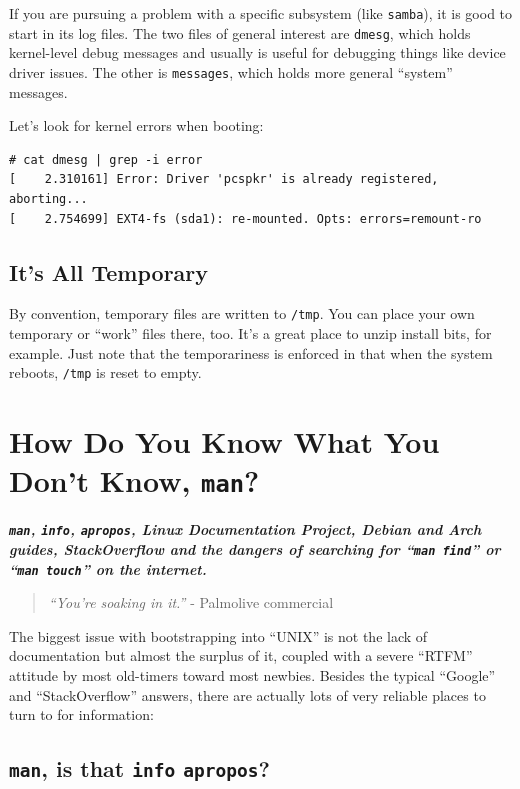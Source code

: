 \documentclass[10pt,]{book}
\numberwithin{figure}{chapter}
\begin{document}
If you are pursuing a problem with a specific subsystem (like
\texttt{samba}), it is good to start in its log files. The two files of
general interest are \texttt{dmesg}, which holds kernel-level debug
messages and usually is useful for debugging things like device driver
issues. The other is \texttt{messages}, which holds more general
``system'' messages.

Let's look for kernel errors when booting:

\begin{verbatim}
# cat dmesg | grep -i error
[    2.310161] Error: Driver 'pcspkr' is already registered, aborting...
[    2.754699] EXT4-fs (sda1): re-mounted. Opts: errors=remount-ro
\end{verbatim}

\section{It's All Temporary}\label{its-all-temporary}

By convention, temporary files are written to \texttt{/tmp}. You can
place your own temporary or ``work'' files there, too. It's a great
place to unzip install bits, for example. Just note that the
temporariness is enforced in that when the system reboots, \texttt{/tmp}
is reset to empty.

\chapter{How Do You Know What You Don't Know,
\texttt{man}?}\label{how-do-you-know-what-you-dont-know-man}

\textbf{\emph{\texttt{man}, \texttt{info}, \texttt{apropos}, Linux
Documentation Project, Debian and Arch guides, StackOverflow and the
dangers of searching for ``\texttt{man find}'' or ``\texttt{man touch}''
on the internet.}}

\begin{quote}
\emph{``You're soaking in it.''} - Palmolive commercial
\end{quote}

The biggest issue with bootstrapping into ``UNIX'' is not the lack of
documentation but almost the surplus of it, coupled with a severe
``RTFM'' attitude by most old-timers toward most newbies. Besides the
typical ``Google'' and ``StackOverflow'' answers, there are actually
lots of very reliable places to turn to for information:

\section{\texttt{man}, is that \texttt{info}
\texttt{apropos}?}\label{man-is-that-info-apropos}
\end{document}
